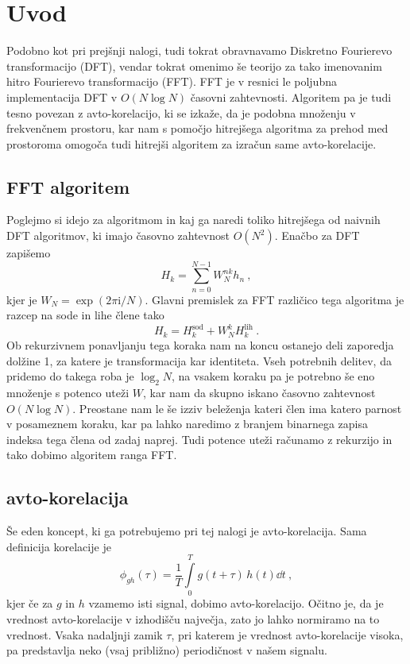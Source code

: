 \documentclass{porocilo}
\newcommand{\ii}{\mathrm{i}}
\newcommand{\intc}{\frac{1}{T}\int\limits_0^{T}}
\begin{document}
\maketitle

\section{Uvod}
Podobno kot pri prejšnji nalogi, tudi tokrat obravnavamo Diskretno Fourierevo transformacijo (DFT), vendar tokrat omenimo še teorijo za tako imenovanim hitro Fourierevo transformacijo (FFT). FFT je v resnici le poljubna implementacija DFT v $O(N \log N)$ časovni zahtevnosti. Algoritem pa je tudi tesno povezan z avto-korelacijo, ki se izkaže, da je podobna množenju v frekvenčnem prostoru, kar nam s pomočjo hitrejšega algoritma za prehod med prostoroma omogoča tudi hitrejši algoritem za izračun same avto-korelacije.

\subsection{FFT algoritem}
Poglejmo si idejo za algoritmom in kaj ga naredi toliko hitrejšega od naivnih DFT algoritmov, ki imajo časovno zahtevnost $O(N^2)$. Enačbo za DFT zapišemo
\begin{equation*}
    H_k = \sum_{n=0}^{N-1} W_N^{nk} h_n \>,
\end{equation*}
kjer je $W_N = \exp(2 \pi \ii / N)$. Glavni premislek za FFT različico tega algoritma je razcep na sode in lihe člene tako
\begin{equation*}
    H_k = H_{k}^\mathrm{sod} + W_N^k H_{k}^\mathrm{lih} \>.
\end{equation*}
Ob rekurzivnem ponavljanju tega koraka nam na koncu ostanejo deli zaporedja dolžine 1, za katere je transformacija kar identiteta. Vseh potrebnih delitev, da pridemo do takega roba je $\log_{2} N$, na vsakem koraku pa je potrebno še eno množenje s potenco uteži $W$, kar nam da skupno iskano časovno zahtevnost $O(N \log N)$. Preostane nam le še izziv beleženja kateri člen ima katero parnost v posameznem koraku, kar pa lahko naredimo z branjem binarnega zapisa indeksa tega člena od zadaj naprej. Tudi potence uteži računamo z rekurzijo in tako dobimo algoritem ranga FFT.%

\subsection{avto-korelacija}
Še eden koncept, ki ga potrebujemo pri tej nalogi je avto-korelacija. Sama definicija korelacije je
\begin{equation*}
    \phi_{gh}(\tau)=\intc g(t+\tau)\,h(t)\dd t \>,
\end{equation*}
kjer če za $g$ in $h$ vzamemo isti signal, dobimo avto-korelacijo. Očitno je, da je vrednost avto-korelacije v izhodišču največja, zato jo lahko normiramo na to vrednost.  Vsaka nadaljnji zamik $\tau$, pri katerem je vrednost avto-korelacije visoka, pa predstavlja neko (vsaj približno) periodičnost v našem signalu.
\end{document}
